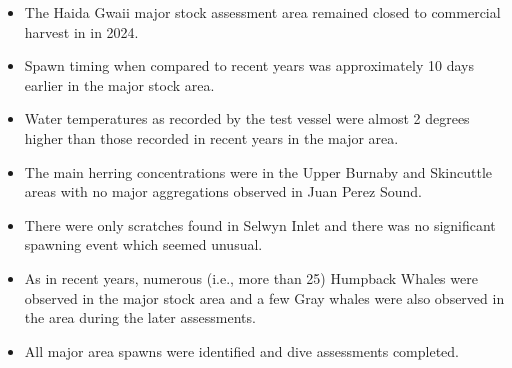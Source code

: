 \begin{itemize}

\item The Haida Gwaii major stock assessment area
remained closed to commercial harvest in in 2024.

\item Spawn timing when compared to recent years was approximately
10 days earlier in the major stock area.

\item Water temperatures as recorded by the test vessel were almost
2 degrees higher than those recorded in recent years in the major area.

\item The main herring concentrations were in the
Upper Burnaby and Skincuttle areas
with no major aggregations observed in Juan Perez Sound. 

\item There were only scratches found in Selwyn Inlet and
there was no significant spawning event which seemed unusual.

\item As in recent years, numerous (i.e., more than 25) Humpback Whales
were observed in the major stock area and
a few Gray whales were also observed in the area during the later assessments.

\item All major area spawns were identified and dive assessments completed.

\end{itemize}